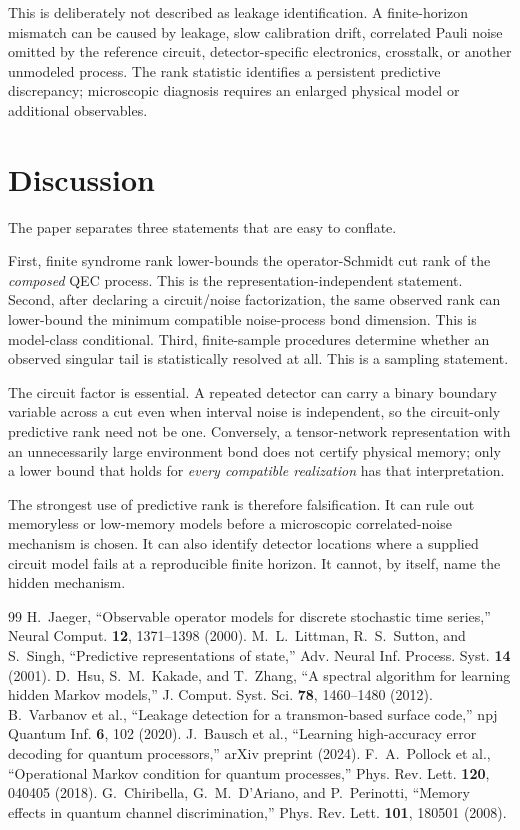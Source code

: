 \documentclass[11pt]{article}
\begin{document}
This is deliberately not described as leakage identification. A finite-horizon mismatch can be caused by leakage, slow calibration drift, correlated Pauli noise omitted by the reference circuit, detector-specific electronics, crosstalk, or another unmodeled process. The rank statistic identifies a persistent predictive discrepancy; microscopic diagnosis requires an enlarged physical model or additional observables.

\section{Discussion}
The paper separates three statements that are easy to conflate.

First, finite syndrome rank lower-bounds the operator-Schmidt cut rank of the \emph{composed} QEC process. This is the representation-independent statement. Second, after declaring a circuit/noise factorization, the same observed rank can lower-bound the minimum compatible noise-process bond dimension. This is model-class conditional. Third, finite-sample procedures determine whether an observed singular tail is statistically resolved at all. This is a sampling statement.

The circuit factor is essential. A repeated detector can carry a binary boundary variable across a cut even when interval noise is independent, so the circuit-only predictive rank need not be one. Conversely, a tensor-network representation with an unnecessarily large environment bond does not certify physical memory; only a lower bound that holds for \emph{every compatible realization} has that interpretation.

The strongest use of predictive rank is therefore falsification. It can rule out memoryless or low-memory models before a microscopic correlated-noise mechanism is chosen. It can also identify detector locations where a supplied circuit model fails at a reproducible finite horizon. It cannot, by itself, name the hidden mechanism.

\begin{thebibliography}{99}\small
{} H.~Jaeger, ``Observable operator models for discrete stochastic time series,'' Neural Comput. \textbf{12}, 1371--1398 (2000).
 M.~L.~Littman, R.~S.~Sutton, and S.~Singh, ``Predictive representations of state,'' Adv. Neural Inf. Process. Syst. \textbf{14} (2001).
 D.~Hsu, S.~M.~Kakade, and T.~Zhang, ``A spectral algorithm for learning hidden Markov models,'' J. Comput. Syst. Sci. \textbf{78}, 1460--1480 (2012).
 B.~Varbanov et al., ``Leakage detection for a transmon-based surface code,'' npj Quantum Inf. \textbf{6}, 102 (2020).
 J.~Bausch et al., ``Learning high-accuracy error decoding for quantum processors,'' arXiv preprint (2024).
 F.~A.~Pollock et al., ``Operational Markov condition for quantum processes,'' Phys. Rev. Lett. \textbf{120}, 040405 (2018).
 G.~Chiribella, G.~M.~D'Ariano, and P.~Perinotti, ``Memory effects in quantum channel discrimination,'' Phys. Rev. Lett. \textbf{101}, 180501 (2008).
\end{thebibliography}
\end{document}
